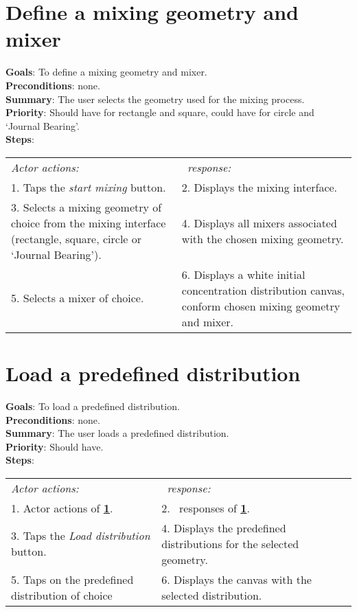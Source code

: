 \section{Define a mixing geometry and mixer}
  \label{geomixer}
  \textbf{Goals}: To define a mixing geometry and mixer.\\
  \textbf{Preconditions}: none.\\
  \textbf{Summary}: The user selects the geometry used for the mixing process.\\
  \textbf{Priority}: Should have for rectangle and square, could have for circle and `Journal Bearing'.\\
  \textbf{Steps}: \\
  \begin{tabular}{ p{} p{} }
  	\emph{Actor actions:} & \emph{\projectname\ response:} \\
	1. Taps the \emph{start mixing} button. & 2. Displays the mixing interface.\\
	3. Selects a mixing geometry of choice from the mixing interface (rectangle, square, circle or `Journal Bearing'). & 4. Displays all mixers associated with the chosen mixing geometry. \\
	5. Selects a mixer of choice. & 6. Displays a white initial concentration distribution canvas, conform chosen mixing geometry and mixer.\\
  \end{tabular}

  \section{Load a predefined distribution}
  \label{loadpreddist}
  \textbf{Goals}: To load a predefined distribution.\\
  \textbf{Preconditions}: none.\\
  \textbf{Summary}: The user loads a predefined distribution.\\
  \textbf{Priority}: Should have.\\
  \textbf{Steps}: \\
  \begin{tabular}{ p{} p{} }
  	\emph{Actor actions:} & \emph{\projectname\ response:} \\
  	1. Actor actions of \textbf{\ref{geomixer}}. & 2. \projectname\ responses of \textbf{\ref{geomixer}}. \\
	3. Taps the \emph{Load distribution} button. & 4. Displays the predefined distributions for the selected geometry. \\
	5. Taps on the predefined distribution of choice & 6. Displays the canvas with the selected distribution. \\
  \end{tabular}

